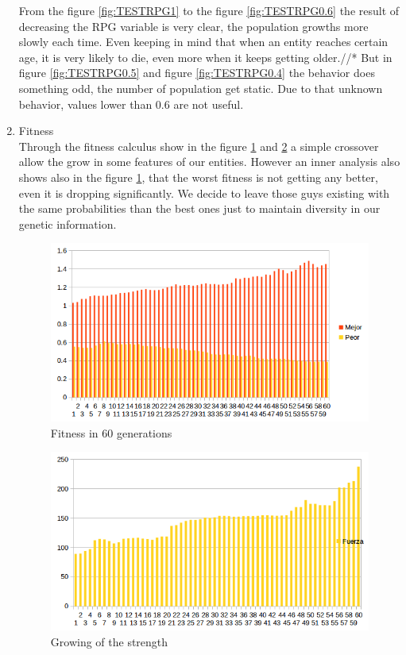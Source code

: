 \documentclass[twocolumn]{IEEEtran}
\begin{document}
\begin{enumerate}
From the figure \ref{fig:TESTRPG1} to the figure \ref{fig:TESTRPG0.6} the result of decreasing the RPG variable is very clear, the population growths more slowly each time. Even keeping in mind that when an entity reaches certain age, it is very likely to die, even more when it keeps getting older.//*  But in figure \ref{fig:TESTRPG0.5} and figure \ref{fig:TESTRPG0.4} the behavior does something odd, the number of population get static. Due to that unknown behavior, values lower than 0.6 are not useful. \\ 


	\item Fitness\\
    Through the fitness calculus show in the figure \ref{fig:fitness60g} and \ref{fig:strength60g} a simple crossover allow the grow in some features of our entities. However an inner analysis also shows also in the figure \ref{fig:fitness60g}, that the worst fitness is not getting any better, even it is dropping significantly. We decide to leave those guys existing with the same probabilities than the best ones just to maintain diversity in our genetic information.    
    
    \begin{figure}[h!]
    \centering
    \includegraphics[width=\columnwidth]{src/bestcrossover.png}
	\caption{Fitness in 60 generations}
    \label{fig:fitness60g}
    \end{figure}
    
    \begin{figure}[h!]
    \centering
    \includegraphics[width=\columnwidth]{src/crecimientodeFuerza.png}
	\caption{Growing of the strength}
    \label{fig:strength60g}
    \end{figure}
    

\end{enumerate}
\end{document}
